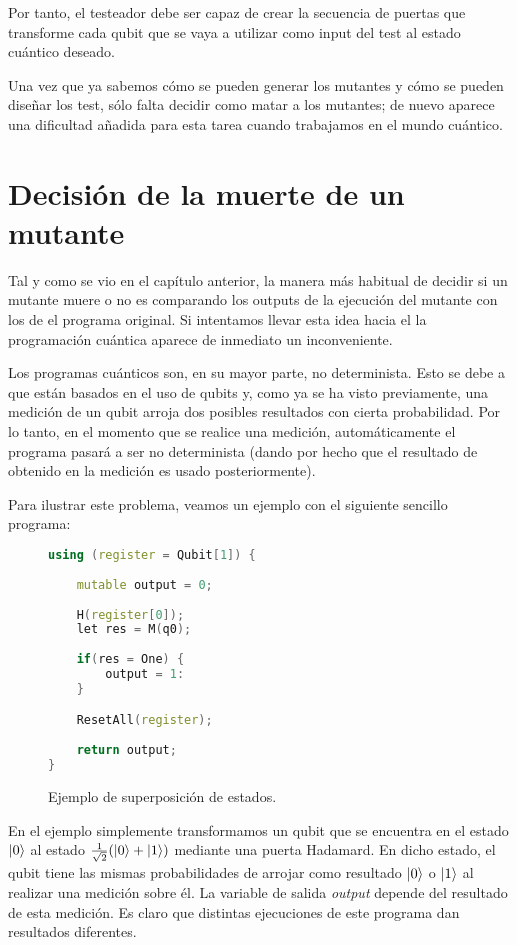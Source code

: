 Por tanto, el testeador debe ser capaz de crear la secuencia de puertas que transforme cada qubit que se vaya a utilizar como input del test al estado cuántico deseado.

Una vez que ya sabemos cómo se pueden generar los mutantes y cómo se pueden diseñar los test, sólo falta decidir como matar a los mutantes; de nuevo aparece una dificultad añadida para esta tarea cuando trabajamos en el mundo cuántico.

\section{Decisión de la muerte de un mutante}

Tal y como se vio en el capítulo anterior, la manera más habitual de decidir si un mutante muere o no es comparando los outputs de la ejecución del mutante con los de el programa original. Si intentamos llevar esta idea hacia el la programación cuántica aparece de inmediato un inconveniente. 

Los programas cuánticos son, en su mayor parte, no determinista. Esto se debe a que están basados en el uso de qubits y, como ya se ha visto previamente, una medición de un qubit arroja dos posibles resultados con cierta probabilidad. Por lo tanto, en el momento que se realice una medición, automáticamente el programa pasará a ser no determinista (dando por hecho que el resultado de obtenido en la medición es usado posteriormente).

Para ilustrar este problema, veamos un ejemplo con el siguiente sencillo programa:
\clearpage

\begin{figure}[htb]
\begin{lstlisting}[language=c++]
using (register = Qubit[1]) {
	
	mutable output = 0; 
	
	H(register[0]);
	let res = M(q0);
	
	if(res = One) {
		output = 1:
	}

	ResetAll(register);
	
	return output;
}
\end{lstlisting}
\caption{Ejemplo de superposición de estados.}
\label{fig:code43}
\end{figure}

En el ejemplo simplemente transformamos un qubit que se encuentra en el estado $\left|0\right\rangle$ al estado $\tfrac{1}{\sqrt{2}}(\left|0\right\rangle+\left|1\right\rangle)$ mediante una puerta Hadamard. En dicho estado, el qubit tiene las mismas probabilidades de arrojar como resultado $\left|0\right\rangle$ o $\left|1\right\rangle$ al realizar una medición sobre él. La variable de salida \textit{output} depende del resultado de esta medición.
Es claro que distintas ejecuciones de este programa dan resultados diferentes.

